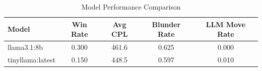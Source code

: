 \begin{table}[h]
\centering
\caption{Model Performance Comparison}
\begin{tabular}{lcccc}
\toprule
Model & Win Rate & Avg CPL & Blunder Rate & LLM Move Rate \\
\midrule
llama3.1:8b & 0.300 & 461.6 & 0.625 & 0.000 \\
tinyllama:latest & 0.150 & 448.5 & 0.597 & 0.010 \\
\bottomrule
\end{tabular}
\end{table}